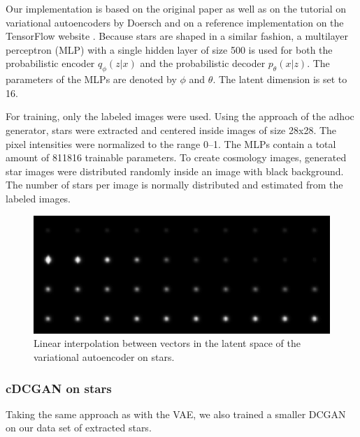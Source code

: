 \documentclass[10pt,conference,compsocconf]{IEEEtran}
\begin{document}
Our implementation is based on the original paper as well as on the tutorial on variational autoencoders by Doersch \cite{doersch2016tutorial} and on a reference implementation on the TensorFlow website \cite{cvaetf}. Because stars are shaped in a similar fashion, a multilayer perceptron (MLP) with a single hidden layer of size \SI{500}{} is used for both the probabilistic encoder $q_{\phi}(z|x)$ and the probabilistic decoder $p_{\theta}(x|z)$. The parameters of the MLPs are denoted by $\phi$ and $\theta$. The latent dimension is set to \SI{16}{}. 

For training, only the labeled images were used. Using the approach of the adhoc generator, stars were extracted and centered inside images of size \SI{28}{}x\SI{28}{}. The pixel intensities were normalized to the range \SIrange{0}{1}{}. The MLPs contain a total amount of \SI{811816}{} trainable parameters. To create cosmology images, generated star images were distributed randomly inside an image with black background. The number of stars per image is normally distributed and estimated from the labeled images. 


\begin{figure}
    \centering
    \includegraphics[width=\columnwidth]{assets/vae_interpolation_resized.png}
    \caption{Linear interpolation between vectors in the latent space of the variational autoencoder on stars.}
    \label{fig:vae_interpolation}
\end{figure}

\subsubsection{cDCGAN on stars}
Taking the same approach as with the VAE, we also trained a smaller DCGAN on our data set of extracted stars.

\end{document}

